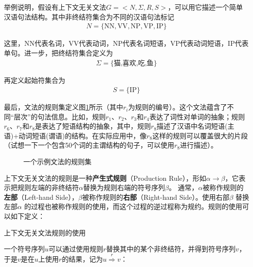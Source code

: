 \parinterval 举例说明，假设有上下文无关文法$G=<N,\varSigma,R,S>$，可以用它描述一个简单汉语句法结构。其中非终结符集合为不同的汉语句法标记
\begin{eqnarray}
N=\{\textrm{NN},\textrm{VV},\textrm{NP},\textrm{VP},\textrm{IP}\} \nonumber
\label{eq:3.4-1}
\end{eqnarray}

\noindent 这里，\textrm{NN}代表名词，\textrm{VV}代表动词，\textrm{NP}代表名词短语，\textrm{VP}代表动词短语，\textrm{IP}代表单句。进一步，把终结符集合定义为
\begin{eqnarray}
\varSigma = \{\text{猫,喜欢,吃,鱼}\} \nonumber
\label{eq:3.4-2}
\end{eqnarray}

再定义起始符集合为
\begin{eqnarray}
S=\{\textrm{IP}\} \nonumber
\label{eq:3.4-3}
\end{eqnarray}

\parinterval 最后，文法的规则集定义图\ref{fig:3.4-2}所示（其中$r_i$为规则的编号）。这个文法蕴含了不同“层次”的句法信息。比如，规则$r_1$、$r_2$、$r_3$和$r_4$表达了词性对单词的抽象；规则$r_6$、$r_7$和$r_8$是表达了短语结构的抽象，其中，规则$r_8$描述了汉语中名词短语(主语)+动词短语(谓语)的结构。在实际应用中，像$r_8$这样的规则可以覆盖很大的片段（试想一下一个包含50个词的主谓结构的句子，可以使用$r_8$进行描述）。

\begin{figure}[htp]
    \centering
 
 \caption{一个示例文法的规则集}
     \label{fig:3.4-2}
 \end{figure}

\parinterval 上下文无关文法的规则是一种{\small\sffamily\bfseries{产生式规则}}（Production Rule），形如$\alpha \to \beta $，它表示把规则左端的非终结符$\alpha$替换为规则右端的符号序列$\beta$。 通常，$\alpha$被称作规则的{\small\sffamily\bfseries{左部}}（Left-hand Side），$\beta$被称作规则的{\small\sffamily\bfseries{右部}}（Right-hand Side）。使用右部$\beta$ 替换左部$\alpha$ 的过程也被称作规则的使用，而这个过程的逆过程称为规约。规则的使用可以如下定义：

\vspace{0.5em}
\begin{definition} 上下文无关文法规则的使用

一个符号序列$u$可以通过使用规则$r$替换其中的某个非终结符，并得到符号序列$v$，于是$v$是在$u$上使用$r$的结果，记为$u \overset{r}{\Rightarrow} v$：
\begin{center}

\end{center}
\end{definition}

